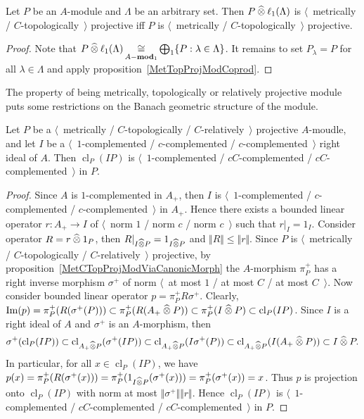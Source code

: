 \begin{corollary}\label{MetTopProjTensProdWithl1} Let $P$ be an $A$-module and
$\Lambda$ be an arbitrary set. Then $P\mathbin{\widehat{\otimes}} \ell_1(\Lambda)$ is
$\langle$~metrically / $C$-topologically~$\rangle$ projective iff $P$ is
$\langle$~metrically / $C$-topologically~$\rangle$ projective.
\end{corollary}
\begin{proof} 
Note that 
$P\mathbin{\widehat{\otimes}} \ell_1(\Lambda)
\mathop{\mathbin{\cong}}\limits_{A-\mathbf{mod}_1}
\bigoplus_1 \{P:\lambda\in\Lambda \}$. It remains to set $P_\lambda=P$ for all
$\lambda\in\Lambda$ and apply proposition~\ref{MetTopProjModCoprod}.
\end{proof}

The property of being metrically, topologically or relatively projective module 
puts some restrictions on the Banach geometric structure of the module.

\begin{proposition}\label{MetTopRelProjModCompIdealPartCompl} Let $P$ 
be a $\langle$~metrically / $C$-topologically / $C$-relatively~$\rangle$ 
projective $A$-moudle, and let $I$ 
be a $\langle$~$1$-complemented / $c$-complemented / $c$-complemented~$\rangle$
right ideal of $A$. Then $\operatorname{cl}_P(I P)$ 
is $\langle$~$1$-complemented / $cC$-complemented / $cC$-complemented~$\rangle$ 
in $P$.
\end{proposition}
\begin{proof} Since $A$ is $1$-complemented in $A_+$, then $I$ 
is $\langle$~$1$-complemented / $c$-complemented / $c$-complemented~$\rangle$
in $A_+$. Hence there exists a bounded linear operator $r:A_+\to I$ of 
$\langle$~norm $1$ / norm $c$ / norm $c$~$\rangle$ such that $r|_I=1_I$. 
Consider operator $R=r\mathbin{\widehat{\otimes}} 1_P$, then $R|_{I\mathbin{\widehat{\otimes}} P}=1_{I\mathbin{\widehat{\otimes}} P}$ 
and $\Vert R\Vert\leq\Vert r\Vert$. Since $P$ 
is $\langle$~metrically / $C$-topologically / $C$-relatively~$\rangle$ 
projective, by proposition~\ref{MetCTopProjModViaCanonicMorph} the 
$A$-morphism $\pi_P^+$ has a right inverse morphism $\sigma^+$ of norm
$\langle$~at most $1$ / at most $C$ / at most $C$~$\rangle$. Now consider 
bounded linear operator $p=\pi_P^+ R \sigma^+$. Clearly,
$\operatorname{Im}(p)=\pi_P^+(R(\sigma^+(P)))
\subset\pi_P^+(R(A_+\mathbin{\widehat{\otimes}} P))
\subset \pi_P^+(I\mathbin{\widehat{\otimes}} P)
\subset \operatorname{cl}_P(I P)$.
Since $I$ is a right ideal of $A$ and $\sigma^+$ is an $A$-morphism, then 
$$
\sigma^+(\operatorname{cl}_P(I P))
\subset \operatorname{cl}_{A_+\mathbin{\widehat{\otimes}} P}(\sigma^+(I P))
\subset \operatorname{cl}_{A_+\mathbin{\widehat{\otimes}} P}(I\sigma^+(P))
\subset \operatorname{cl}_{A_+\mathbin{\widehat{\otimes}} P}(I (A_+\mathbin{\widehat{\otimes}} P))
\subset I \mathbin{\widehat{\otimes}} P.
$$
In particular, for all $x\in \operatorname{cl}_P(I P)$, we have 
$p(x)
=\pi_P^+(R(\sigma^+(x)))
=\pi_P^+(1_{I\mathbin{\widehat{\otimes}} P}(\sigma^+(x)))
=\pi_P^+(\sigma^+(x))
=x$. 
Thus $p$ is projection onto $\operatorname{cl}_P(I P)$ with norm at 
most $\Vert \sigma^+\Vert\Vert r\Vert$. Hence $\operatorname{cl}_P(I P)$ 
is $\langle$~$1$-complemented / $cC$-complemented / 
$cC$-complemented~$\rangle$ in $P$.
\end{proof}

